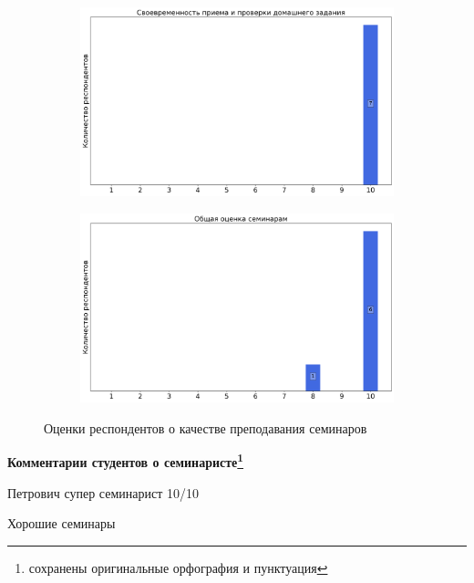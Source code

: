 \begin{figure}[H]
\begin{subfigure}[b]{0.45\textwidth}
				\includegraphics[width=\textwidth]{images/2 course/Кратные интегралы и теория поля/seminarists-marks-Петрович А.Ю.-2.png}
			\end{subfigure}
			\begin{subfigure}[b]{0.45\textwidth}
				\centering
				\includegraphics[width=\textwidth]{images/2 course/Кратные интегралы и теория поля/seminarists-marks-Петрович А.Ю.-3.png}
			\end{subfigure}	
			\caption{Оценки респондентов о качестве преподавания семинаров}
		\end{figure}

		\textbf{Комментарии студентов о семинаристе\protect\footnote{сохранены оригинальные орфография и пунктуация}}
            \begin{commentbox} 
                Петрович супер семинарист 10/10 
            \end{commentbox} 
        
            \begin{commentbox} 
                Хорошие семинары 
            \end{commentbox}

